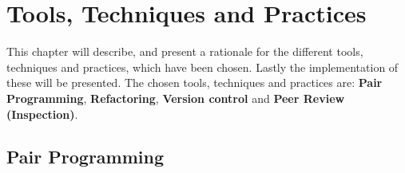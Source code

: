 
\chapter{Tools, Techniques and Practices} %
\label{cha:tools_techniques_and_practices}
This chapter will describe, and present a rationale for the different tools, techniques and practices, which have been chosen.
Lastly the implementation of these will be presented.
The chosen tools, techniques and practices are: \textbf{Pair Programming}, \textbf{Refactoring}, \textbf{Version control} and \textbf{Peer Review (Inspection)}.

\section*{Pair Programming} %
\label{sec:pair_programming}
